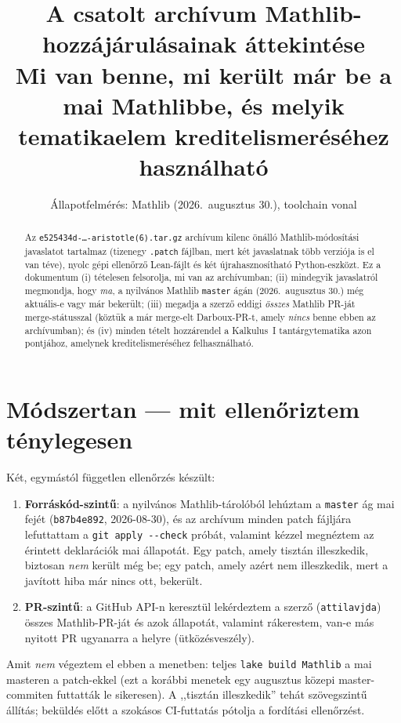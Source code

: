 \documentclass[11pt,a4paper]{article}
\title{\textbf{A csatolt archívum Mathlib-hozzájárulásainak áttekintése}\\[2mm]
\large Mi van benne, mi került már be a mai Mathlibbe, és melyik
tematika\-elem kreditelismeréséhez használható}
\author{}
\date{Állapotfelmérés: Mathlib \lean{master} \lean{b87b4e892} (2026.\ augusztus 30.),
toolchain \lean{v4.\bk 34.\bk 0-rc1} vonal}
\newcommand{\lean}[1]{\texttt{\small #1}}
\newcommand{\bk}{\allowbreak}
\begin{document}
\maketitle

\begin{abstract}
Az \lean{e525434d-\dots-aristotle(6).\bk tar.\bk gz} archívum kilenc önálló Mathlib-módosítási
javaslatot tartalmaz (tizenegy \lean{.\bk patch} fájlban, mert két javaslatnak több
verziója is el van téve), nyolc gépi ellenőrző Lean-fájlt és két újrahasznosítható
Python-eszközt. Ez a dokumentum (i) tételesen felsorolja, mi van az archívumban;
(ii) mindegyik javaslatról megmondja, hogy \emph{ma}, a nyilvános Mathlib
\lean{master} ágán (2026.\ augusztus 30.) még aktuális-e vagy már bekerült;
(iii) megadja a szerző eddigi \emph{összes} Mathlib PR-ját merge-státusszal
(köztük a már merge-elt Darboux-PR-t, amely \emph{nincs} benne ebben az
archívumban); és (iv) minden tételt hozzárendel a Kalkulus~I tantárgytematika
azon pontjához, amelynek kreditelismeréséhez felhasználható.
\end{abstract}

\tableofcontents

\section{Módszertan --- mit ellenőriztem ténylegesen}

Két, egymástól független ellenőrzés készült:

\begin{enumerate}[nosep]
  \item \textbf{Forráskód-szintű}: a nyilvános Mathlib-tárolóból lehúztam a
    \lean{master} ág mai fejét (\lean{b87b4e892}, 2026-08-30), és az archívum
    minden patch fájljára lefuttattam a \lean{git apply -{}-check} próbát,
    valamint kézzel megnéztem az érintett deklarációk mai állapotát.
    Egy patch, amely tisztán illeszkedik, biztosan \emph{nem} került még be;
    egy patch, amely azért nem illeszkedik, mert a javított hiba már nincs ott,
    bekerült.
  \item \textbf{PR-szintű}: a GitHub API-n keresztül lekérdeztem a szerző
    (\lean{attilavjda}) összes Mathlib-PR-ját és azok állapotát, valamint
    rákerestem, van-e más nyitott PR ugyanarra a helyre (ütközésveszély).
\end{enumerate}

\noindent
Amit \emph{nem} végeztem el ebben a menetben: teljes \lean{lake build Mathlib}
a mai masteren a patch-ekkel (ezt a korábbi menetek egy augusztus közepi
master-commiten futtatták le sikeresen). A ,,tisztán illeszkedik'' tehát
szövegszintű állítás; beküldés előtt a szokásos CI-futtatás pótolja a
fordítási ellenőrzést.
\end{document}
